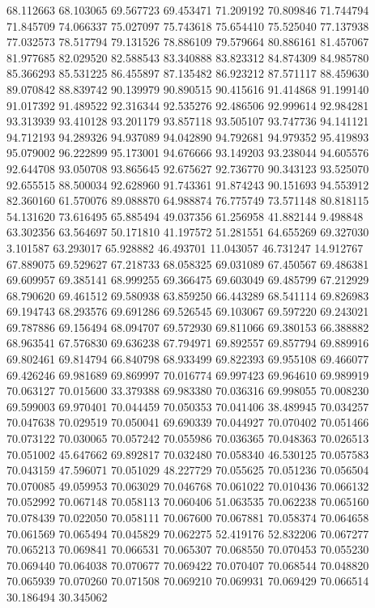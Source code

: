 68.112663
68.103065
69.567723
69.453471
71.209192
70.809846
71.744794
71.845709
74.066337
75.027097
75.743618
75.654410
75.525040
77.137938
77.032573
78.517794
79.131526
78.886109
79.579664
80.886161
81.457067
81.977685
82.029520
82.588543
83.340888
83.823312
84.874309
84.985780
85.366293
85.531225
86.455897
87.135482
86.923212
87.571117
88.459630
89.070842
88.839742
90.139979
90.890515
90.415616
91.414868
91.199140
91.017392
91.489522
92.316344
92.535276
92.486506
92.999614
92.984281
93.313939
93.410128
93.201179
93.857118
93.505107
93.747736
94.141121
94.712193
94.289326
94.937089
94.042890
94.792681
94.979352
95.419893
95.079002
96.222899
95.173001
94.676666
93.149203
93.238044
94.605576
92.644708
93.050708
93.865645
92.675627
92.736770
90.343123
93.525070
92.655515
88.500034
92.628960
91.743361
91.874243
90.151693
94.553912
82.360160
61.570076
89.088870
64.988874
76.775749
73.571148
80.818115
54.131620
73.616495
65.885494
49.037356
61.256958
41.882144
9.498848
63.302356
63.564697
50.171810
41.197572
51.281551
64.655269
69.327030
3.101587
63.293017
65.928882
46.493701
11.043057
46.731247
14.912767
67.889075
69.529627
67.218733
68.058325
69.031089
67.450567
69.486381
69.609957
69.385141
68.999255
69.366475
69.603049
69.485799
67.212929
68.790620
69.461512
69.580938
63.859250
66.443289
68.541114
69.826983
69.194743
68.293576
69.691286
69.526545
69.103067
69.597220
69.243021
69.787886
69.156494
68.094707
69.572930
69.811066
69.380153
66.388882
68.963541
67.576830
69.636238
67.794971
69.892557
69.857794
69.889916
69.802461
69.814794
66.840798
68.933499
69.822393
69.955108
69.466077
69.426246
69.981689
69.869997
70.016774
69.997423
69.964610
69.989919
70.063127
70.015600
33.379388
69.983380
70.036316
69.998055
70.008230
69.599003
69.970401
70.044459
70.050353
70.041406
38.489945
70.034257
70.047638
70.029519
70.050041
69.690339
70.044927
70.070402
70.051466
70.073122
70.030065
70.057242
70.055986
70.036365
70.048363
70.026513
70.051002
45.647662
69.892817
70.032480
70.058340
46.530125
70.057583
70.043159
47.596071
70.051029
48.227729
70.055625
70.051236
70.056504
70.070085
49.059953
70.063029
70.046768
70.061022
70.010436
70.066132
70.052992
70.067148
70.058113
70.060406
51.063535
70.062238
70.065160
70.078439
70.022050
70.058111
70.067600
70.067881
70.058374
70.064658
70.061569
70.065494
70.045829
70.062275
52.419176
52.832206
70.067277
70.065213
70.069841
70.066531
70.065307
70.068550
70.070453
70.055230
70.069440
70.064038
70.070677
70.069422
70.070407
70.068544
70.048820
70.065939
70.070260
70.071508
70.069210
70.069931
70.069429
70.066514
30.186494
30.345062
